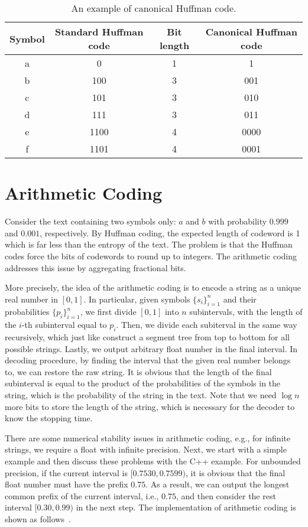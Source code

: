 \documentclass[a4paper,11pt]{article}
\begin{document}
\begin{table}[h]
\centering
\begin{tabular}{c|c|c|c}
Symbol & Standard Huffman code & Bit length & Canonical Huffman code \\
\hline
a & 0    & 1 & 1 \\
b & 100  & 3 & 001 \\
c & 101  & 3 & 010 \\
d & 111  & 3 & 011 \\
e & 1100 & 4 & 0000 \\
f & 1101 & 4 & 0001
\end{tabular}
\caption{An example of canonical Huffman code.} 
\label{table:chc_example}
\end{table}


\section{Arithmetic Coding}
Consider the text containing two symbols only: $a$ and $b$ with probability $0.999$ and $0.001$, respectively. By Huffman coding, the expected length of codeword is 1 which is far less than the entropy of the text. The problem is that the Huffman codes force the bits of codewords to round up to integers. The arithmetic coding addresses this issue by aggregating fractional bits.

More precisely, the idea of the arithmetic coding is to encode a string as a unique real number in $[0, 1]$. In particular, given symbols $\{s_i\}_{i=1}^{n}$ and their probabilities $\{p_i\}_{i=1}^{n}$, we first divide $[0, 1]$ into $n$ subintervals, with the length of the $i$-th subinterval equal to $p_i$. Then, we divide each subiterval in the same way recursively, which just like construct a segment tree from top to bottom for all possible strings. Lastly, we output arbitrary float number in the final interval. In decoding procedure, by finding the interval that the given real number belongs to, we can restore the raw string. It is obvious that the length of the final subinterval is equal to the product of the probabilities of the symbols in the string, which is the probability of the string in the text. Note that we need $\log n$ more bits to store the length of the string, which is necessary for the decoder to know the stopping time. 

There are some numerical stability issues in arithmetic coding, e.g., for infinite strings, we require a float with infinite precision. Next, we start with a simple example and then discuss these problems with the C++ example. For unbounded precision, if the current interval is $[0.7530, 0.7599)$, it is obvious that the final float number must have the prefix $0.75$. As a result, we can output the longest common prefix of the current interval, i.e., $0.75$, and then consider the rest interval $[0.30, 0.99)$ in the next step. The implementation of arithmetic coding is shown as follows~\citep{nelson2014data}.
\end{document}
